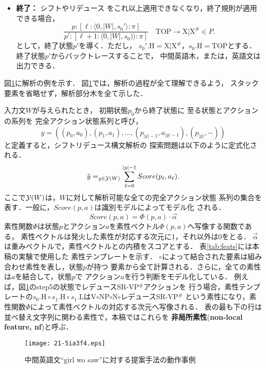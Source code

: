 \documentclass[japanese]{jnlp_1.4}
\newcommand{\argmax}{}
\begin{document}
\begin{itemize}
\item {\bf 終了：} シフトやリデュース
をこれ以上適用できなくなり，終了規則が適用できる場合，
\[
\frac{p: [\ell: \langle 0, |W|, s_{0}'\rangle: \pi]}{p': [\ell+1: \langle 0, |W|, s_{0})\rangle: \pi]}
\quad \text{TOP}\rightarrow \text{X}|\text{X}^{\#}\in P.
\]
として，終了状態$p'$を導く．ただし，
$s_{0}'.\text{H}=\text{X}|\text{X}^{\#}$，$s_{0}.\text{H}=\text{TOP}$とする．
終了状態$p'$からバックトレースすることで，
中間英語木，または，英語文は出力できる．
\end{itemize}

図\ref{fig:process}に解析の例を示す．
図\ref{fig:process}では，解析の過程が全て理解できるよう，
スタック要素を省略せず，解析部分木を全て示した．


入力文$W$が与えられたとき，
初期状態$p_{0}$から終了状態に
至る状態とアクションの系列を
完全アクション状態系列と呼び，
\begin{equation}
y=((p_{0},a_{0}),(p_{1},a_{1}),\dots,(p_{|y|-1},a_{|y|-1}),(p_{|y|},-))
\end{equation}
と定義すると，シフトリデュース構文解析の
探索問題は以下のように定式化される．
\begin{equation}
{\hat y}=\argmax_{y\in{\cal Y}(W)}\sum_{\ell=0}^{|y|-1}Score(p_{\ell},a_{\ell}).
\end{equation}
ここで${\cal Y}(W)$は，$W$に対して解析可能な全ての完全アクション状態
系列の集合を表す．一般に，$Score(p,a)$は識別モデルによってモデル化
される．
\begin{equation}
Score(p,a)=\Phi(p,a)\cdot\overrightarrow{\alpha}
\end{equation}
素性関数$\Phi$は状態$p$とアクション$a$を素性ベクトル$\Phi (p,a)$へ写像する関数である，
素性ベクトルは発火した素性が対応する次元に1，それ以外は0をとる．
$\overrightarrow{\alpha}$は重みベクトルで，素性ベクトルとの内積をスコアとする．
表\ref{tab:feats}には本稿の実験で使用した
素性テンプレートを示す．
$\circ$によって結合された要素は組み合わせ素性を表し，状態$p$が持つ
要素から全て計算される．さらに，全ての素性は$a$を結合して，状態$p$で
アクション$a$を行う判断をモデル化している．
例えば，図\ref{fig:process}のstep5の状態でレデュースSR-VP$^{\#}$アクションを
行う場合，素性テンプレートの$s_{0}.\text{H}\circ s_{1}.\text{H}\circ s_{1}.\text{L}$はV$\circ$NP$\circ$N$\circ$レデュースSR-VP$^{\#}$
という素性になり，素性関数$\Phi$によって素性ベクトルの対応する次元へ写像される．
表の最も下の行は並べ替え文字列に関わる素性で，本稿ではこれらを
{\bf 非局所素性}({\bf non-local feature, nf})と呼ぶ．

\begin{figure}[t]
\begin{center}
\texttt{[image: 21-5ia3f4.eps]}
\end{center}
\caption{中間英語文``girl wo saw''に対する提案手法の動作事例}
\label{fig:process}
\vspace{-1\Cvs}
\end{figure}
\end{document}
